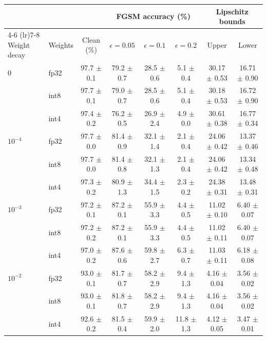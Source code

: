 \begin{tabular}{llcccccc}
\toprule
 & & & \multicolumn{3}{c}{FGSM accuracy (\%)} & \multicolumn{2}{c}{Lipschitz bounds} \\
\cmidrule(lr){4-6} \cmidrule(lr){7-8}
Weight decay & Weights & Clean (\%) & $\epsilon = 0.05$ & $\epsilon = 0.1$ & $\epsilon = 0.2$ & Upper & Lower \\
\midrule
0 & fp32 & 97.7 $\pm$ 0.1 & 79.2 $\pm$ 0.7 & 28.5 $\pm$ 0.6 & 5.1 $\pm$ 0.4 & 30.17 $\pm$ 0.53 & 16.71 $\pm$ 0.90 \\
 & int8 & 97.7 $\pm$ 0.1 & 79.0 $\pm$ 0.7 & 28.5 $\pm$ 0.6 & 5.1 $\pm$ 0.4 & 30.18 $\pm$ 0.53 & 16.72 $\pm$ 0.90 \\
 & int4 & 97.4 $\pm$ 0.2 & 76.2 $\pm$ 0.5 & 26.9 $\pm$ 2.4 & 4.9 $\pm$ 0.0 & 30.61 $\pm$ 0.38 & 16.77 $\pm$ 0.34 \\
\addlinespace
$10^{-4}$ & fp32 & 97.7 $\pm$ 0.0 & 81.4 $\pm$ 0.9 & 32.1 $\pm$ 1.4 & 2.1 $\pm$ 0.4 & 24.06 $\pm$ 0.42 & 13.37 $\pm$ 0.46 \\
 & int8 & 97.7 $\pm$ 0.0 & 81.4 $\pm$ 0.8 & 32.1 $\pm$ 1.3 & 2.1 $\pm$ 0.4 & 24.06 $\pm$ 0.42 & 13.34 $\pm$ 0.48 \\
 & int4 & 97.3 $\pm$ 0.2 & 80.9 $\pm$ 1.3 & 34.4 $\pm$ 1.5 & 2.3 $\pm$ 0.2 & 24.38 $\pm$ 0.31 & 13.48 $\pm$ 0.31 \\
\addlinespace
$10^{-3}$ & fp32 & 97.2 $\pm$ 0.1 & 87.2 $\pm$ 0.1 & 55.9 $\pm$ 3.3 & 4.4 $\pm$ 0.5 & 11.02 $\pm$ 0.10 & 6.40 $\pm$ 0.07 \\
 & int8 & 97.2 $\pm$ 0.2 & 87.2 $\pm$ 0.1 & 55.9 $\pm$ 3.3 & 4.4 $\pm$ 0.5 & 11.02 $\pm$ 0.11 & 6.40 $\pm$ 0.07 \\
 & int4 & 97.0 $\pm$ 0.2 & 87.6 $\pm$ 0.6 & 59.8 $\pm$ 2.7 & 6.3 $\pm$ 0.7 & 11.03 $\pm$ 0.11 & 6.18 $\pm$ 0.08 \\
\addlinespace
$10^{-2}$ & fp32 & 93.0 $\pm$ 0.1 & 81.7 $\pm$ 0.7 & 58.2 $\pm$ 2.9 & 9.4 $\pm$ 1.3 & 4.16 $\pm$ 0.04 & 3.56 $\pm$ 0.02 \\
 & int8 & 93.0 $\pm$ 0.1 & 81.8 $\pm$ 0.7 & 58.2 $\pm$ 2.9 & 9.4 $\pm$ 1.3 & 4.16 $\pm$ 0.04 & 3.56 $\pm$ 0.02 \\
 & int4 & 92.6 $\pm$ 0.2 & 81.5 $\pm$ 0.4 & 59.9 $\pm$ 2.0 & 11.8 $\pm$ 1.3 & 4.12 $\pm$ 0.05 & 3.47 $\pm$ 0.01 \\
\bottomrule
\end{tabular}
